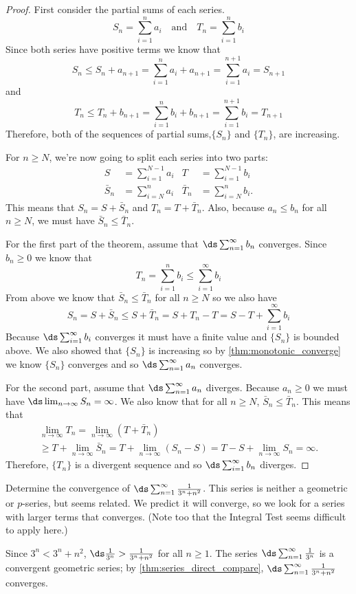 \begin{proof}
First consider the partial sums of each series.
\[S_n=\sum_{i=1}^n a_i \quad \text{and} \quad T_n=\sum_{i=1}^n b_i\]
Since both series have positive terms we know that
\[S_n\leq S_n+a_{n+1}=\sum_{i=1}^n a_i+a_{n+1}=\sum_{i=1}^{n+1} a_i=S_{n+1}\]
and
\[T_n\leq T_n+b_{n+1}=\sum_{i=1}^n b_i+b_{n+1}=\sum_{i=1}^{n+1} b_i=T_{n+1}\]
Therefore, both of the sequences of partial sums,$\{S_n\}$ and $\{T_n\}$, are increasing.

For $n\ge N$, we're now going to split each series into two parts:
\begin{align*}
S&=\sum_{i=1}^{N-1}a_i & T&=\sum_{i=1}^{N-1}b_i \\
\bar S_n&=\sum_{i=N}^n a_i & \bar T_n&=\sum_{i=N}^n b_i.
\end{align*}
This means that $S_n=S+\bar S_n$ and $T_n=T+\bar T_n$.
Also, because $a_n\leq b_n$ for all $n\geq N$, we must have $\bar S_n\leq\bar T_n$.

For the first part of the theorem, assume that $\ds \sum_{n=1}^\infty b_n$ converges. Since $b_n\geq 0$ we know that 
\[T_n=\sum_{i=1}^n b_i\leq \sum_{i=1}^\infty b_i\]
From above we know that $\bar S_n\leq\bar T_n$ for all $n\geq N$ so we also have
\[S_n=S+\bar S_n\le S+\bar T_n=S+T_n-T=S-T+\sum_{i=1}^\infty b_i\]
Because $\ds \sum_{i=1}^\infty b_i$ converges it must have a finite value and $\{S_n\}$ is bounded above. We also showed that $\{S_n\}$ is increasing so by \autoref{thm:monotonic_converge} we know $\{S_n\}$ converges and so $\ds \sum_{n=1}^\infty a_n$ converges.

For the second part, assume that $\ds\sum_{n=1}^\infty a_n$ diverges. Because $a_n\geq 0$ we must have $\ds\lim_{n\to\infty} S_n=\infty$. We also know that for all $n\ge N$, $\bar S_n\leq\bar T_n$.  This means that
\begin{multline*}
\lim_{n\to \infty} T_n=\lim_{n\to \infty}(T+\bar T_n)\\
\ge T+\lim_{n\to \infty}\bar S_n=T+\lim_{n\to \infty}(S_n-S)
=T-S+\lim_{n\to \infty}S_n=\infty.
\end{multline*}
Therefore, $\{T_n\}$ is a divergent sequence and so $\ds \sum_{i=1}^\infty b_n$ diverges.
\end{proof}


\begin{example}\label{ex_dct1}%
Determine the convergence of $\ds\sum_{n=1}^\infty \frac1{3^n+n^2}$.
\solution
This series is neither a geometric or $p$-series, but seems related. We predict it will converge, so we look for a series with larger terms that converges. (Note too that the Integral Test seems difficult to apply here.)

Since $3^n < 3^n+n^2$, $\ds \frac1{3^n}> \frac1{3^n+n^2}$ for all $n\geq1$. The series $\ds\sum_{n=1}^\infty \frac{1}{3^n}$ is a convergent geometric series; by \autoref{thm:series_direct_compare}, $\ds \sum_{n=1}^\infty \frac1{3^n+n^2}$ converges.
\end{example}

